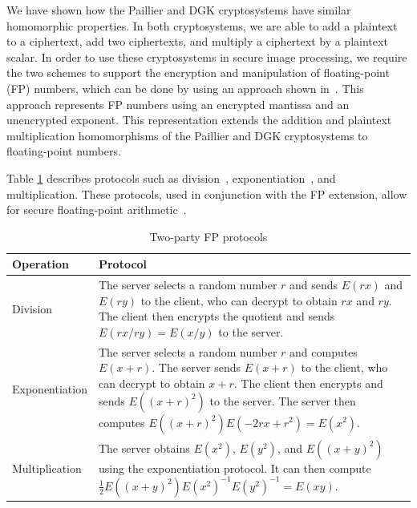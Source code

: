We have shown how the Paillier and DGK cryptosystems have similar homomorphic properties. In both cryptosystems, we are able to add a plaintext to a ciphertext, add two ciphertexts, and multiply a ciphertext by a plaintext scalar.
In order to use these cryptosystems in secure image processing, we require the two schemes to support the encryption and manipulation of floating-point (FP) numbers, which can be done by using an approach shown in~\cite{ziad_cryptoimg:_2016}. This approach represents FP numbers using an encrypted mantissa and an unencrypted exponent. This representation extends the addition and plaintext multiplication homomorphisms of the Paillier and DGK cryptosystems to floating-point numbers.

Table \ref{tab:flop_summary} describes protocols such as division~\cite{boukoros_lightweight_2017}, exponentiation~\cite{hutchison_privacy-preserving_2009}, and multiplication. These protocols, used in conjunction with the FP extension, allow for secure floating-point arithmetic~\cite{pcsc-paper}.

\begin{table}[ht]
	\caption{Two-party FP protocols}
	\label{tab:flop_summary}
    \begin{tabular}{
        p{}
        p{}}
		\toprule
		Operation & Protocol\\
        \midrule
            Division &
            The server selects a random number $r$ and sends $E(rx)$ and $E(ry)$ to the client, who can decrypt to obtain $rx$ and $ry$. The client then encrypts the quotient and sends $E(rx/ry) = E(x/y)$ to the server. 
            \\
            Exponentiation &
            The server selects a random number $r$ and computes $E\left(x+r\right)$. The server sends $E(x+r)$  to the client, who can decrypt to obtain $x+r$. The client then encrypts and sends $E((x+r)^2)$ to the server. The server then computes $E\left(\left(x+r\right)^2\right)E\left(-2rx + r^2\right) = E\left(x^2\right)$.
            \\
            Multiplication &
            The server obtains $E(x^2)$, $E(y^2)$, and $E((x+y)^2)$ using the exponentiation protocol. It can then compute $\frac{1}{2}E\left(\left(x+y\right)^2\right)E\left(x^2\right)^{-1}E\left(y^2\right)^{-1} = E\left(xy\right)$.\\
	    \bottomrule
    \end{tabular}
\end{table}
